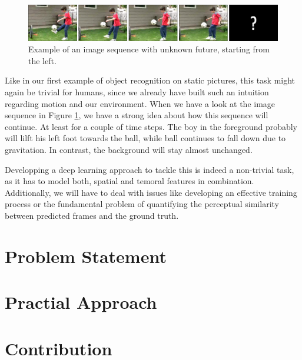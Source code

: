 \begin{figure}[htpb]
	\centering
	\includegraphics[scale=0.25]{figures/ucf-intro/serie1.png} 
	\caption[Example: Image sequence]{Example of an image sequence with unknown future, starting from the left.} \label{fig:intro-seq}
\end{figure}

Like in our first example of object recognition on static pictures, this task might again be trivial for humans, since we already have built such an intuition regarding motion and our environment. When we have a look at the image sequence in Figure \ref{fig:intro-seq}, we have a strong idea about how this sequence will continue. At least for a couple of time steps. The boy in the foreground probably will lilft his left foot towards the ball, while ball continues to fall down due to gravitation. In contrast, the background will stay almost unchanged.

Developping a deep learning approach to tackle this is indeed a non-trivial task, as it has to model both, spatial and temoral features in combination. Additionally, we will have to deal with issues like developing an effective training process or the fundamental problem of quantifying the perceptual similarity between predicted frames and the ground truth.

\section{Problem Statement}

\section{Practial Approach} %
% 

\section{Contribution}

